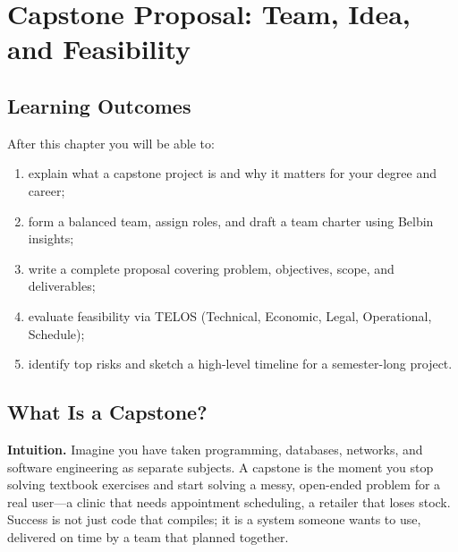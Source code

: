 \chapter{Capstone Proposal: Team, Idea, and Feasibility}
\label{ch:proposal}

\noindent{}
\vspace{0.4em}

\section*{Learning Outcomes}
After this chapter you will be able to:
\begin{enumerate}[label=(L\arabic*)]
    \item explain what a capstone project is and why it matters for your degree and career;
    \item form a balanced team, assign roles, and draft a team charter using Belbin insights;
    \item write a complete proposal covering problem, objectives, scope, and deliverables;
    \item evaluate feasibility via TELOS (Technical, Economic, Legal, Operational, Schedule);
    \item identify top risks and sketch a high-level timeline for a semester-long project.
\end{enumerate}

\section{What Is a Capstone?}
\label{sec:what-capstone}

\textbf{Intuition.} Imagine you have taken programming, databases, networks, and software engineering as separate subjects. A capstone is the moment you stop solving textbook exercises and start solving a messy, open-ended problem for a real user---a clinic that needs appointment scheduling, a retailer that loses stock. Success is not just code that compiles; it is a system someone wants to use, delivered on time by a team that planned together.

